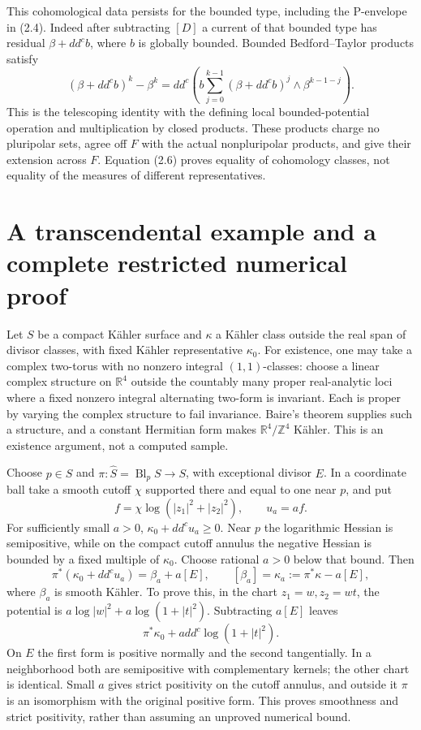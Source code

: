\documentclass[11pt]{article}
\newcommand{\ddc}{dd^c}
\begin{document}
This cohomological data persists for the bounded type, including the P-envelope in (2.4). Indeed after subtracting $[D]$ a current of that bounded type has residual $\beta+\ddc b$, where $b$ is globally bounded. Bounded Bedford--Taylor products satisfy
\[
 (\beta+\ddc b)^k-\beta^k
 =\ddc\left(b\sum_{j=0}^{k-1}(\beta+\ddc b)^j\wedge\beta^{k-1-j}\right).
 \tag{2.6}
\]
This is the telescoping identity with the defining local bounded-potential operation and multiplication by closed products. These products charge no pluripolar sets, agree off $F$ with the actual nonpluripolar products, and give their extension across $F$. Equation (2.6) proves equality of cohomology classes, not equality of the measures of different representatives.

\section{A transcendental example and a complete restricted numerical proof}
Let $S$ be a compact K\"ahler surface and $\kappa$ a K\"ahler class outside the real span of divisor classes, with fixed K\"ahler representative $\kappa_0$. For existence, one may take a complex two-torus with no nonzero integral $(1,1)$-classes: choose a linear complex structure on $\mathbb R^4$ outside the countably many proper real-analytic loci where a fixed nonzero integral alternating two-form is invariant. Each is proper by varying the complex structure to fail invariance. Baire's theorem supplies such a structure, and a constant Hermitian form makes $\mathbb R^4/\mathbb Z^4$ K\"ahler. This is an existence argument, not a computed sample.

Choose $p\in S$ and $\pi:\widehat S=\operatorname{Bl}_pS\to S$, with exceptional divisor $E$. In a coordinate ball take a smooth cutoff $\chi$ supported there and equal to one near $p$, and put
\[
 f=\chi\log(|z_1|^2+|z_2|^2),\qquad u_a=af.
\]
For sufficiently small $a>0$, $\kappa_0+\ddc u_a\geq0$. Near $p$ the logarithmic Hessian is semipositive, while on the compact cutoff annulus the negative Hessian is bounded by a fixed multiple of $\kappa_0$. Choose rational $a>0$ below that bound. Then
\[
 \pi^*(\kappa_0+\ddc u_a)=\beta_a+a[E],\qquad
 [\beta_a]=\kappa_a:=\pi^*\kappa-a[E], \tag{3.1}
\]
where $\beta_a$ is smooth K\"ahler. To prove this, in the chart $z_1=w,z_2=wt$, the potential is $a\log|w|^2+a\log(1+|t|^2)$. Subtracting $a[E]$ leaves
\[
                  \pi^*\kappa_0+a\ddc\log(1+|t|^2).
\]
On $E$ the first form is positive normally and the second tangentially. In a neighborhood both are semipositive with complementary kernels; the other chart is identical. Small $a$ gives strict positivity on the cutoff annulus, and outside it $\pi$ is an isomorphism with the original positive form. This proves smoothness and strict positivity, rather than assuming an unproved numerical bound.
\end{document}
